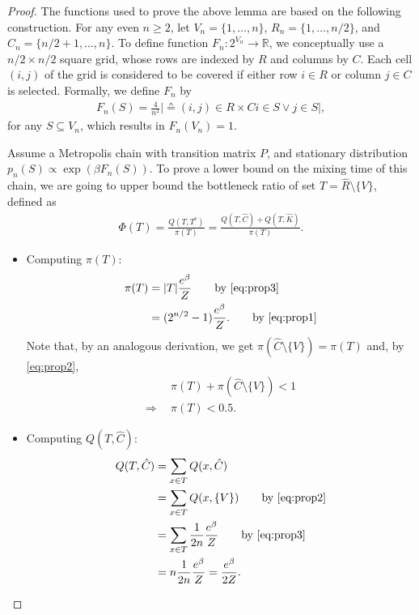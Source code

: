 \begin{proof}
The functions used to prove the above lemma are based on the following construction.
For any even $n \geq 2$, let $V_n = \{1,\ldots,n\}$, $R_n = \{1,\ldots,n/2\}$, and $C_n = \{n/2+1,\ldots,n\}$.
To define function $F_n : 2^{V_n} \to \mathbb{R}$, we conceptually use a $n/2 \times n/2$ square grid, whose rows are indexed by $R$ and columns by $C$.
Each cell $(i, j)$ of the grid is considered to be covered if either row $i \in R$ or column $j \in C$ is selected.
Formally, we define $F_n$ by
\begin{align*}
  F_n(S) = \frac{4}{n^2}\big\vert \sdef{(i, j) \in R \times C}{i \in S \lor j \in S}\big\vert,
\end{align*}
for any $S \subseteq V_n$, which results in $F_n(V_n) = 1$.

Assume a Metropolis chain with transition matrix $P$, and stationary distribution $p_n(S) \propto \exp(\beta F_n(S))$.
To prove a lower bound on the mixing time of this chain, we are going to upper bound the bottleneck ratio of set $T = \hat{R} \setminus \{V\}$, defined as
\begin{align*}
  \Phi(T) = \frac{Q(T, T^c)}{\pi(T)} = \frac{Q(T, \hat{C}) + Q(T, \hat{K})}{\pi(T)}.
\end{align*}

\begin{itemize}
  \item Computing $\pi(T)$:
    \begin{align*}
      \pi(T) &= |T| \frac{e^{\beta}}{Z} \tag*{by \eqref{eq:prop3}} \\
             &= (2^{n/2} - 1) \frac{e^{\beta}}{Z}. \tag*{by \eqref{eq:prop1}}
    \end{align*}
    Note that, by an analogous derivation, we get $\pi(\hat{C} \setminus \{V\}) = \pi(T)$ and, by \eqref{eq:prop2},
    \begin{align*}
      &\pi(T) + \pi(\hat{C} \setminus \{V\}) < 1 \\
      \Rightarrow\ \ &\pi(T) < 0.5.
    \end{align*}
  
  \item Computing $Q(T, \hat{C})$:
    \begin{align*}
      Q(T, \hat{C}) &= \sum_{x \in T} Q(x, \hat{C}) \\
                    &= \sum_{x \in T} Q(x, \{V\}) \tag*{by \eqref{eq:prop2}} \\
                    &= \sum_{x \in T} \frac{1}{2n} \frac{e^{\beta}}{Z} \tag*{by \eqref{eq:prop3}} \\
                    &= n \frac{1}{2n} \frac{e^{\beta}}{Z} = \frac{e^{\beta}}{2Z}.
    \end{align*}
    

\end{itemize}
\end{proof}
